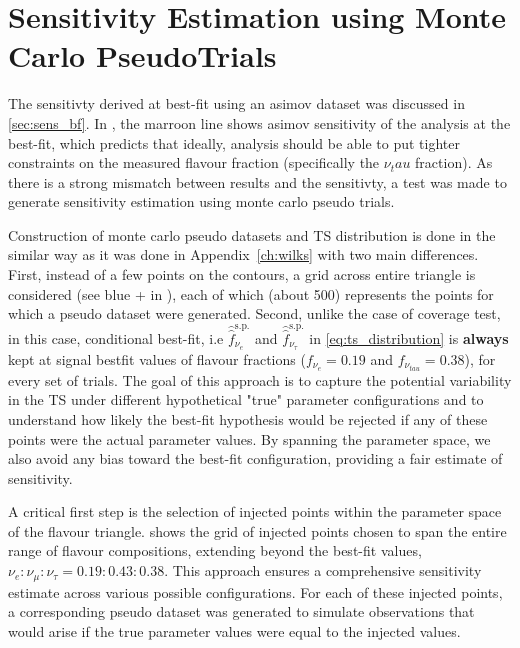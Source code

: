 \chapter{Sensitivity Estimation using Monte Carlo PseudoTrials}
\label{ch:sensitivity_checks}
The sensitivty derived at best-fit using an asimov dataset  was discussed in \ref{sec:sens_bf}. In , the marroon line shows asimov sensitivity of the analysis at the best-fit, which predicts that ideally, analysis should be able to put tighter constraints on the measured flavour fraction (specifically the $\nu_tau$ fraction). As there is a strong mismatch between results and the sensitivty, a test was made to generate sensitivity estimation using monte carlo pseudo trials.

Construction of monte carlo pseudo datasets and TS distribution is done in the similar way as it was done in Appendix~\ref{ch:wilks} with two main differences. First, instead of a few points on the contours, a grid across entire triangle is considered (see blue + in ), each of which (about 500) represents the points for which a pseudo dataset were generated. Second, unlike the case of coverage test, in this case, conditional best-fit, i.e \(\hat{\hat{f}}_{\nu_e}^{\text{s.p.}}\) and \(\hat{\hat{f}}_{\nu_\tau}^{\text{s.p.}}\) in \ref{eq:ts_distribution} is \textbf{always} kept at signal bestfit values of flavour fractions ($f_{\nu_e} = 0.19$ and $f_{\nu_{tau}}=0.38$), for every set of trials. The goal of this approach is to capture the potential variability in the TS under different hypothetical "true" parameter configurations and to understand how likely the best-fit hypothesis would be rejected if any of these points were the actual parameter values. By spanning the parameter space, we also avoid any bias toward the best-fit configuration, providing a fair estimate of sensitivity.

A critical first step is the selection of injected points within the parameter space of the flavour triangle.  shows the grid of injected points chosen to span the entire range of flavour compositions, extending beyond the best-fit values, $\nu_e:\nu_{\mu}:\nu_{\tau} = 0.19:0.43:0.38$. This approach ensures a comprehensive sensitivity estimate across various possible configurations. For each of these injected points, a corresponding pseudo dataset was generated to simulate observations that would arise if the true parameter values were equal to the injected values.

